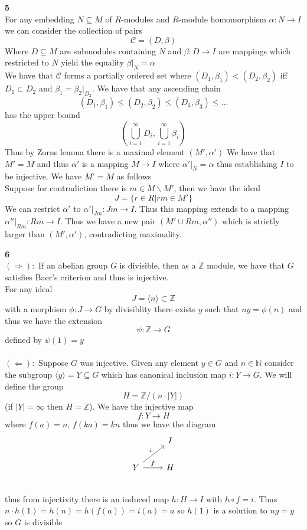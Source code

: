 \documentclass[12pt]{article}
\newenvironment{ques}[1]{\textbf{#1}\vspace{1 mm}\\ }{\bigskip}
\theoremstyle{definition}
\renewcommand{\l}{\left }
\renewcommand{\r}{\right }
\newcommand{\Z}{\mathbb Z}
\newcommand{\N}{\mathbb N}
\renewcommand{\a}{\alpha}
\renewcommand{\b}{\beta}
\begin{document}
\begin{ques}{5}
	For any embedding $N \subseteq M$ of $R$-modules and $R$-module
	homomorphism $\a:N \to I$ we can consider the collection of pairs
	$$\mathcal C = (D, \b)$$
	Where $D\subseteq M$ are submodules containing $N$ and $\b:D \to I$ are
	mappings which restricted to $N$ yield the equality $\b|_N = \a$\\
	We have that $\mathcal C$ forms a partially ordered set where $(D_1,
	\b_1) < (D_2, \b_2)$ iff $D_1 \subset D_2$ and $\b_1 =
	\b_2|_{D_2}$. We have that any ascending chain
	$$(D_1, \b_1) \leq (D_2, \b_2) \leq (D_3, \b_3) \leq \dots$$
	has the upper bound
	$$\l(\bigcup_{i=1}^\infty D_i, \bigcup_{i=1}^\infty \b_i \r)$$
	Thus by Zorns lemma there is a maximal element $(M',\a')$ We have that
	$M' = M$ and thus $\a'$ is a mapping $M \to I$ where $\a'|_N = \a$ thus
	establishing $I$ to be injective. We have $M' = M$ as follows\\
	Suppose for contradiction there is $m \in M \backslash M'$, then we have
	the ideal
	$$J = \{r \in R| rm\in M'\}$$
	We can restrict $\a'$ to $\a'|_{Jm} : Jm \to I$. Thus this mapping extends
	to a mapping $\a''|_{Rm}:Rm \to I$. Thus we have a new pair $(M' \cup Rm, \a'')$
	which is strictly larger than $(M', \a')$, contradicting maximality.
\end{ques}

\begin{ques}{6}
	$(\Rightarrow):$ If an abelian group $G$ is divisible, then as a $\Z$
	module, we have that $G$ satisfies Baer's criterion and thus is injective.\\
	For any ideal
	$$J = \langle n \rangle \subset \Z$$
	with a morphism $\phi: J \to G$ by divisiblity there exists $y$ such that
	$ny = \phi(n)$ and thus we have the extension
	$$\psi:\Z \to G$$
	defined by $\psi(1) = y$\\
	\\
	$(\Leftarrow):$ Suppose $G$ was injective. Given any element $y \in G$ and
	$n \in \N$ consider the subgroup $\langle y \rangle = Y
	\subseteq G$ which has canonical inclusion map $i:Y \to G$. We will define the group
	$$H = \Z/(n\cdot |Y|)$$
	(if $|Y| = \infty$ then $H = \Z$). We have the injective map
	$$f:Y \to H$$
	where $f(a) = n$, $f(ka) = kn$ thus we have the diagram
	$$\begin{tikzcd}
	 & I\\
	Y \arrow[ur, "i"] \arrow[r, "f"] & H\\
	\end{tikzcd}$$
	thus from injectivity there is an induced map $h:H \to I$ with $h \circ f =
	i$. Thus $n \cdot h(1) = h(n) = h(f(a)) = i(a) = a$ so $h(1)$ is a solution
	to $ng = y$ so $G$ is divisible
\end{ques}
\end{document}
